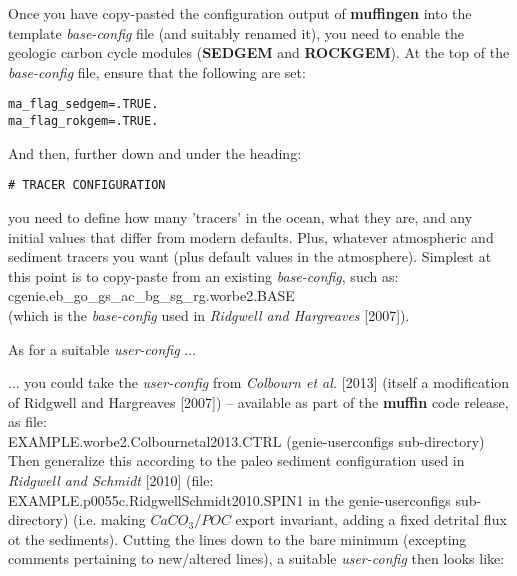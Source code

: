 \documentclass[11pt,fleqn]{book} %
\begin{document}
Once you have copy-pasted the configuration output of \textbf{muffingen} into the template \textit{base-config} file (and suitably renamed it), you need to enable the geologic carbon cycle modules (\textbf{SEDGEM} and \textbf{ROCKGEM}). At the top of the \textit{base-config} file, ensure that the following are set:
\vspace{-1mm}\small\begin{verbatim}
ma_flag_sedgem=.TRUE.
ma_flag_rokgem=.TRUE.
\end{verbatim}\normalsize\vspace{-1mm}
And then, further down and under the heading:
\vspace{-1mm}\small\begin{verbatim}
# TRACER CONFIGURATION
\end{verbatim}\normalsize\vspace{-1mm}
you need to define how many 'tracers' in the ocean, what they are, and any initial values that differ from modern defaults. Plus, whatever atmospheric and sediment tracers you want (plus default values in the atmosphere). Simplest at this point is to copy-paste from an existing \textit{base-config}, such as:
\vspace{1mm}
\\\textsf{\footnotesize cgenie.eb\_go\_gs\_ac\_bg\_sg\_rg.worbe2.BASE}
\vspace{1mm}
\\(which is the \textit{base-config} used in \textit{Ridgwell and Hargreaves} [2007]).

\vspace{1mm}
As for a suitable \textit{user-config} ...

\vspace{12mm}
\pagebreak

... you could take the \textit{user-config} from \textit{Colbourn et al.} [2013] (itself a modification of Ridgwell and Hargreaves [2007]) -- available as part of the \textbf{muffin} code release, as file:
\vspace{1mm}
\\\textsf{\footnotesize EXAMPLE.worbe2.Colbournetal2013.CTRL } (\textsf{\footnotesize genie-userconfigs } sub-directory)
\vspace{1mm}
\\Then generalize this according to the paleo sediment configuration used in \textit{Ridgwell and Schmidt} [2010] (file: \textsf{\footnotesize EXAMPLE.p0055c.RidgwellSchmidt2010.SPIN1 } in the \textsf{\footnotesize genie-userconfigs } sub-directory) (i.e. making \(CaCO_{3}/POC\) export invariant, adding a fixed detrital flux ot the sediments). Cutting the lines down to the bare minimum (excepting comments pertaining to new/altered lines), a suitable \textit{user-config} then looks like:
\end{document}

